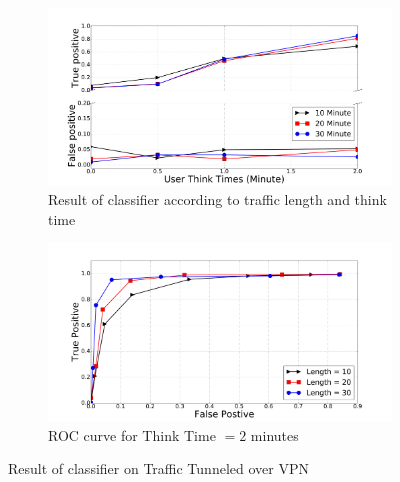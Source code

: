 \begin{figure}[!t]
\begin{subfigure}{.48\linewidth}
\centering
\includegraphics[width=\linewidth]{image/jan25/vpn_d2u.pdf}
\caption{Result of  classifier according to traffic length and think time}
\label{fig:tp}
\end{subfigure}
\centering
\begin{subfigure}{.48\linewidth}
\includegraphics[width=\linewidth]{image/jan25/roc_vpn_d2u.pdf}
\caption{ROC curve for Think Time $=2$ minutes}
\label{fig:fp}
\end{subfigure}
\caption{Result of  classifier on \bc Traffic Tunneled over VPN}
\label{fig:vpn}
\end{figure}
\fi



















